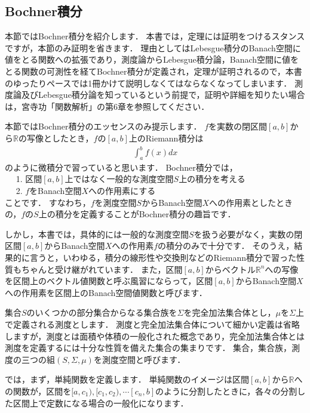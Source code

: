 \subsection{Bochner積分}\label{sec:bochner_integral}
本節ではBochner積分を紹介します．
本書では，定理には証明をつけるスタンスですが，本節のみ証明を省きます．
理由としてはLebesgue積分のBanach空間に値をとる関数への拡張であり，測度論からLebesgue積分論，Banach空間に値をとる関数の可測性を経てBochner積分が定義され，定理が証明されるので，本書のゆったりペースでは1冊かけて説明しなくてはならなくなってしまいます．
測度論及びLebesgue積分論を知っているという前提で，証明や詳細を知りたい場合は，宮寺功「関数解析」の第6章を参照してください．

本節ではBochner積分のエッセンスのみ提示します．
$f$を実数の閉区間$[a, b]$から${\mathbb R}$の写像としたとき，$f$の$[a, b]$上のRiemann積分は
\begin{align*}
\int_a^b f(x) dx
\end{align*}
のように微積分で習っていると思います．
Bochner積分では，\\
\noindent ~~ 1. 区間$[a, b]$上ではなく一般的な測度空間$S$上の積分を考える \\
\noindent ~~ 2. $f$をBanach空間$X$への作用素にする\\
ことです．
すなわち，$f$を測度空間$S$からBanach空間$X$への作用素としたときの，$f$の$S$上の積分を定義することがBochner積分の趣旨です．


しかし，本書では，具体的には一般的な測度空間$S$を扱う必要がなく，実数の閉区間$[a, b]$からBanach空間$X$への作用素$f$の積分のみで十分です．
そのうえ，結果的に言うと，いわゆる，積分の線形性や交換則などのRiemann積分で習った性質もちゃんと受け継がれています．
また，区間$[a, b]$からベクトル${\mathbb R}^n$への写像を区間上のベクトル値関数と呼ぶ風習にならって，区間$[a, b]$からBanach空間$X$への作用素を区間上のBanach空間値関数と呼びます．


集合$S$のいくつかの部分集合からなる集合族を$\Sigma$を完全加法集合体とし，$\mu$を$\Sigma$上で定義される測度とします．
測度と完全加法集合体について細かい定義は省略しますが，測度とは面積や体積の一般化された概念であり，完全加法集合体とは測度を定義するには十分な性質を備えた集合の集まりです．
集合，集合族，測度の三つの組$(S, \Sigma, \mu)$を測度空間と呼びます．

では，まず，単純関数を定義します．
単純関数のイメージは区間$[a, b]$から${\mathbb R}$への関数が，区間を$[a, c_1), [c_1, c_2), \cdots [c_n, b]$のように分割したときに，各々の分割した区間上で定数になる場合の一般化になります．

